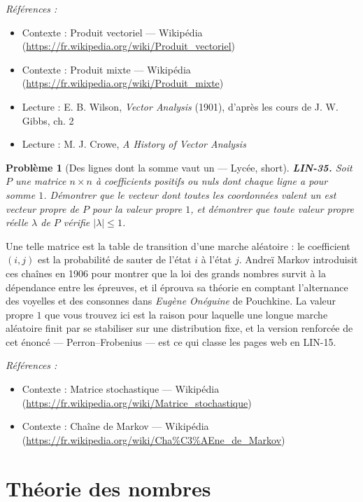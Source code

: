 \documentclass[11pt]{article}
\newtheorem{problem}{Problème}
\newenvironment{refs}{\par\small\noindent\emph{Références :}\begin{itemize}\setlength\itemsep{0pt}}{\end{itemize}\normalsize}
\begin{document}
\begin{refs}
\item Contexte : Produit vectoriel --- Wikipédia (\url{https://fr.wikipedia.org/wiki/Produit_vectoriel})
\item Contexte : Produit mixte --- Wikipédia (\url{https://fr.wikipedia.org/wiki/Produit_mixte})
\item Lecture : E. B. Wilson, \textit{Vector Analysis} (1901), d'après les cours de J. W. Gibbs, ch. 2
\item Lecture : M. J. Crowe, \textit{A History of Vector Analysis}
\end{refs}

\bigskip

\begin{problem}[{Des lignes dont la somme vaut un --- Lycée, short}]
\textbf{LIN-35.} Soit $P$ une matrice $n \times n$ à coefficients positifs
ou nuls dont chaque ligne a pour somme $1$. Démontrer que le vecteur dont toutes les coordonnées
valent un est vecteur propre de $P$ pour la valeur propre $1$, et démontrer que toute valeur
propre réelle $\lambda$ de $P$ vérifie $|\lambda| \le 1$.
\end{problem}

\noindent Une telle matrice est la table de transition d'une marche aléatoire : le
coefficient $(i,j)$ est la probabilité de sauter de l'état $i$ à l'état $j$. Andreï Markov
introduisit ces chaînes en 1906 pour montrer que la loi des grands nombres survit à la dépendance
entre les épreuves, et il éprouva sa théorie en comptant l'alternance des voyelles et des consonnes
dans \textit{Eugène Onéguine} de Pouchkine. La valeur propre $1$ que vous trouvez ici est la raison
pour laquelle une longue marche aléatoire finit par se stabiliser sur une distribution fixe, et la
version renforcée de cet énoncé --- Perron--Frobenius --- est ce qui classe les pages web en LIN-15.

\begin{refs}
\item Contexte : Matrice stochastique --- Wikipédia (\url{https://fr.wikipedia.org/wiki/Matrice_stochastique})
\item Contexte : Chaîne de Markov --- Wikipédia (\url{https://fr.wikipedia.org/wiki/Cha%C3%AEne_de_Markov})
\end{refs}

\bigskip


\section*{Théorie des nombres}
\end{document}
